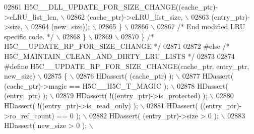 \begin{DoxyCode}
02861 \textcolor{preprocessor}{        H5C\_\_DLL\_UPDATE\_FOR\_SIZE\_CHANGE((cache\_ptr)->cLRU\_list\_len,   \(\backslash\)}
02862 \textcolor{preprocessor}{                                (cache\_ptr)->cLRU\_list\_size,  \(\backslash\)}
02863 \textcolor{preprocessor}{                                (entry\_ptr)->size,            \(\backslash\)}
02864 \textcolor{preprocessor}{                        (new\_size));                  \(\backslash\)}
02865 \textcolor{preprocessor}{        \}                                                                 \(\backslash\)}
02866 \textcolor{preprocessor}{                                                                          \(\backslash\)}
02867 \textcolor{preprocessor}{        }\textcolor{comment}{/* End modified LRU specific code. */}\textcolor{preprocessor}{                             \(\backslash\)}
02868 \textcolor{preprocessor}{    \}                                                                     \(\backslash\)}
02869 \textcolor{preprocessor}{                                                                          \(\backslash\)}
02870 \textcolor{preprocessor}{\} }\textcolor{comment}{/* H5C\_\_UPDATE\_RP\_FOR\_SIZE\_CHANGE */}\textcolor{preprocessor}{}
02871 
02872 \textcolor{preprocessor}{#else }\textcolor{comment}{/* H5C\_MAINTAIN\_CLEAN\_AND\_DIRTY\_LRU\_LISTS */}\textcolor{preprocessor}{}
02873 
02874 \textcolor{preprocessor}{#define H5C\_\_UPDATE\_RP\_FOR\_SIZE\_CHANGE(cache\_ptr, entry\_ptr, new\_size)    \(\backslash\)}
02875 \textcolor{preprocessor}{\{                                                                         \(\backslash\)}
02876 \textcolor{preprocessor}{    HDassert( (cache\_ptr) );                                              \(\backslash\)}
02877 \textcolor{preprocessor}{    HDassert( (cache\_ptr)->magic == H5C\_\_H5C\_T\_MAGIC );                   \(\backslash\)}
02878 \textcolor{preprocessor}{    HDassert( (entry\_ptr) );                                              \(\backslash\)}
02879 \textcolor{preprocessor}{    HDassert( !((entry\_ptr)->is\_protected) );                             \(\backslash\)}
02880 \textcolor{preprocessor}{    HDassert( !((entry\_ptr)->is\_read\_only) );                             \(\backslash\)}
02881 \textcolor{preprocessor}{    HDassert( ((entry\_ptr)->ro\_ref\_count) == 0 );                         \(\backslash\)}
02882 \textcolor{preprocessor}{    HDassert( (entry\_ptr)->size > 0 );                                    \(\backslash\)}
02883 \textcolor{preprocessor}{    HDassert( new\_size > 0 );                                             \(\backslash\)}

\end{DoxyCode}

